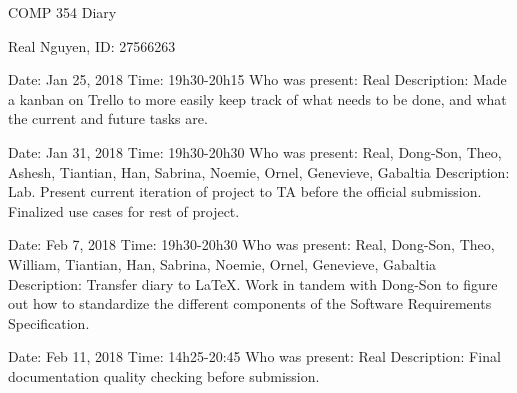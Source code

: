 \documentclass{article}
\begin{document}
 
\begin{center}
    COMP 354 Diary
\end{center}
 
\begin{center}
    Real Nguyen, ID: 27566263
\end{center}
 
\begin{flushleft}
Date: Jan 25, 2018 \newline
Time: 19h30-20h15 \newline
Who was present: Real\newline
Description: Made a kanban on Trello to more easily keep track of what needs to be done, and what the current and future tasks are.\newline
\end{flushleft}
 
\begin{flushleft}
Date: Jan 31, 2018 \newline
Time: 19h30-20h30 \newline
Who was present: Real, Dong-Son, Theo, Ashesh, Tiantian, Han, Sabrina, Noemie, Ornel, Genevieve, Gabaltia\newline
Description: Lab. Present current iteration of project to TA before the official submission. Finalized use cases for rest of project.\newline
\end{flushleft} 
 
\begin{flushleft}
Date: Feb 7, 2018\newline
Time: 19h30-20h30\newline
Who was present: Real, Dong-Son, Theo, William, Tiantian, Han, Sabrina, Noemie, Ornel, Genevieve, Gabaltia\newline
Description: Transfer diary to LaTeX. Work in tandem with Dong-Son to figure out how to standardize the different components of the Software Requirements Specification.\newline
\end{flushleft}

\begin{flushleft}
Date: Feb 11, 2018\newline
Time: 14h25-20:45\newline
Who was present: Real\newline
Description: Final documentation quality checking before submission.\newline
\end{flushleft}
 
\end{document}
